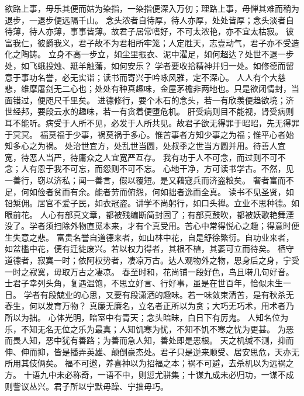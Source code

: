 \documentclass[12pt,UTF8]{ctexbook}
\begin{document}
欲路上事，毋乐其便而姑为染指，一染指便深入万仞；理路上事，毋惮其难而稍为退步，一退步便远隔千山。
念头浓者自待厚，待人亦厚，处处皆厚；念头淡者自待薄，待人亦薄，事事皆薄。故君子居常嗜好，不可太浓艳，亦不宜太枯寂。
彼富我仁，彼爵我义，君子故不为君相所牢笼；人定胜天，志壹动气，君子亦不受造化之陶铸。
立身不高一步立，如尘里振衣、泥中濯足，如何超达？处世不退一步处，如飞蛾投烛、羝羊触藩，如何安乐？
学者要收拾精神并归一处。如修德而留意于事功名誉，必无实诣；读书而寄兴于吟咏风雅，定不深心。
人人有个大慈悲，维摩屠刽无二心也；处处有种真趣味，金屋茅檐非两地也。只是欲闭情封，当面错过，便咫尺千里矣。
进德修行，要个木石的念头，若一有欣羡便趋欲境；济世经邦，要段云水的趣味，若一有贪着便堕危机。
肝受病则目不能视，肾受病则耳不能听。病受于人所不见，必发于人所共见。故君子欲无得罪于昭昭，先无得罪于冥冥。
福莫福于少事，祸莫祸于多心。惟苦事者方知少事之为福；惟平心者始知多心之为祸。
处治世宜方，处乱世当圆，处叔季之世当方圆并用。待善人宜宽，待恶人当严，待庸众之人宜宽严互存。
我有功于人不可念，而过则不可不念；人有恩于我不可忘，而怨则不可不忘。
心地干净，方可读书学古。不然，见一善行，窃以济私；闻一善言，假以覆短。是又藉寇兵而济盗粮矣。
奢者富而不足，何如俭者贫而有余。能者劳而俯怨，何如拙者逸而全真。
读书不见圣贤，如铅椠佣。居官不爱子民，如衣冠盗。讲学不尚躬行，如口头禅。立业不思种德。如眼前花。
人心有部真文章，都被残编断简封固了；有部真鼓吹，都被妖歌艳舞湮没了。学者须扫除外物直觅本来，才有个真受用。苦心中常得悦心之趣；得意时便生失意之悲。
富贵名誉自道德来者，如山林中花，自是舒徐繁衍。自功业来者，如盆槛中花，便有迁徙废兴。若以权力得者，其根不植，其萎可立而待矣。
栖守道德者，寂寞一时；依阿权势者，凄凉万古。达人观物外之物，思身后之身，宁受一时之寂寞，毋取万古之凄凉。
春至时和，花尚铺一段好色，鸟且啭几句好音。士君子幸列头角，复遇温饱，不思立好言、行好事，虽是在世百年，恰似未生一日。
学者有段兢业的心思，又要有段潇洒的趣味。若一味敛束清苦，是有秋杀无春生，何以发育万物？
真廉无廉名，立名者正所以为贪；大巧无巧术，用术者乃所以为拙。
心体光明，暗室中有青天；念头暗昧，白日下有厉鬼。
人知名位为乐，不知无名无位之乐为最真；人知饥寒为忧，不知不饥不寒之忧为更甚。
为恶而畏人知，恶中犹有善路；为善而急人知，善处即是恶根。
天之机缄不测，抑而伸、伸而抑，皆是播弄英雄、颠倒豪杰处。君子只是逆来顺受、居安思危，天亦无所用其伎俩矣。
福不可邀，养喜神以为招福之本；祸不可避，去杀机以为远祸之方。
十语九中未必称奇，一语不中，则愆尤骈集；十谋九成未必归功，一谋不成则訾议丛兴。君子所以宁默毋躁、宁拙毋巧。
\end{document}
